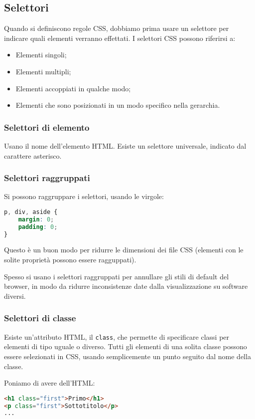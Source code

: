 \documentclass[a4paper,11pt]{article}
\begin{document}
\subsection{Selettori}
Quando si definiscono regole CSS, dobbiamo prima usare un selettore per indicare quali elementi verranno effettati.
I selettori CSS possono riferirsi a:
\begin{itemize}
	\item Elementi singoli;
	\item Elementi multipli;
	\item Elementi accoppiati in qualche modo;
	\item Elementi che sono posizionati in un modo specifico nella gerarchia.
\end{itemize}

\subsubsection{Selettori di elemento}
Usano il nome dell'elemento HTML.
Esiste un selettore universale, indicato dal carattere asterisco.
\subsubsection{Selettori raggruppati}
Si possono raggruppare i selettori, usando le virgole:
\begin{lstlisting}[language=css, style=codestyle]	
p, div, aside { 
	margin: 0;
	padding: 0;
}
\end{lstlisting}
Questo è un buon modo per ridurre le dimensioni dei file CSS (elementi con le solite proprietà possono essere ragguppati).

Spesso si usano i selettori raggruppati per annullare gli stili di default del browser, in modo da ridurre inconsistenze date dalla visualizzazione su software diversi.

\subsubsection{Selettori di classe}
Esiste un'attributo HTML, il \lstinline|class|, che permette di specificare classi per elementi di tipo uguale o diverso.
Tutti gli elementi di una solita classe possono essere selezionati in CSS, usando semplicemente un punto seguito dal nome della classe.

Poniamo di avere dell'HTML:
\begin{lstlisting}[language=html, style=codestyle]	
<h1 class="first">Primo</h1>
<p class="first">Sottotitolo</p>
...
\end{lstlisting}
\end{document}
